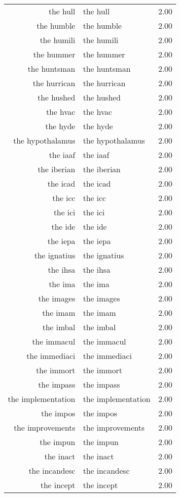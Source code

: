 \begin{table}[ht]
\begin{tabular}{rlr}
  the hull & the hull & 2.00 \\ 
  the humble & the humble & 2.00 \\ 
  the humili & the humili & 2.00 \\ 
  the hummer & the hummer & 2.00 \\ 
  the huntsman & the huntsman & 2.00 \\ 
  the hurrican & the hurrican & 2.00 \\ 
  the hushed & the hushed & 2.00 \\ 
  the hvac & the hvac & 2.00 \\ 
  the hyde & the hyde & 2.00 \\ 
  the hypothalamus & the hypothalamus & 2.00 \\ 
  the iaaf & the iaaf & 2.00 \\ 
  the iberian & the iberian & 2.00 \\ 
  the icad & the icad & 2.00 \\ 
  the icc & the icc & 2.00 \\ 
  the ici & the ici & 2.00 \\ 
  the ide & the ide & 2.00 \\ 
  the iepa & the iepa & 2.00 \\ 
  the ignatius & the ignatius & 2.00 \\ 
  the ihsa & the ihsa & 2.00 \\ 
  the ima & the ima & 2.00 \\ 
  the images & the images & 2.00 \\ 
  the imam & the imam & 2.00 \\ 
  the imbal & the imbal & 2.00 \\ 
  the immacul & the immacul & 2.00 \\ 
  the immediaci & the immediaci & 2.00 \\ 
  the immort & the immort & 2.00 \\ 
  the impass & the impass & 2.00 \\ 
  the implementation & the implementation & 2.00 \\ 
  the impos & the impos & 2.00 \\ 
  the improvements & the improvements & 2.00 \\ 
  the impun & the impun & 2.00 \\ 
  the inact & the inact & 2.00 \\ 
  the incandesc & the incandesc & 2.00 \\ 
  the incept & the incept & 2.00 \\ 

\end{tabular}
\end{table}
